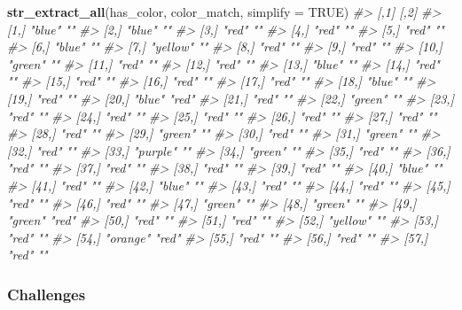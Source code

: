 \documentclass[]{book}
\newenvironment{Shaded}{\begin{snugshade}}{\end{snugshade}}
\newcommand{\CommentTok}[1]{\textcolor[rgb]{0.56,0.35,0.01}{\textit{#1}}}
\newcommand{\DataTypeTok}[1]{\textcolor[rgb]{0.13,0.29,0.53}{#1}}
\newcommand{\KeywordTok}[1]{\textcolor[rgb]{0.13,0.29,0.53}{\textbf{#1}}}
\newcommand{\NormalTok}[1]{#1}
\newcommand{\OtherTok}[1]{\textcolor[rgb]{0.56,0.35,0.01}{#1}}
\begin{document}
\begin{Shaded}
\begin{Highlighting}[]
\KeywordTok{str_extract_all}\NormalTok{(has_color, color_match, }\DataTypeTok{simplify =} \OtherTok{TRUE}\NormalTok{)}
\CommentTok{#>       [,1]     [,2] }
\CommentTok{#>  [1,] "blue"   ""   }
\CommentTok{#>  [2,] "blue"   ""   }
\CommentTok{#>  [3,] "red"    ""   }
\CommentTok{#>  [4,] "red"    ""   }
\CommentTok{#>  [5,] "red"    ""   }
\CommentTok{#>  [6,] "blue"   ""   }
\CommentTok{#>  [7,] "yellow" ""   }
\CommentTok{#>  [8,] "red"    ""   }
\CommentTok{#>  [9,] "red"    ""   }
\CommentTok{#> [10,] "green"  ""   }
\CommentTok{#> [11,] "red"    ""   }
\CommentTok{#> [12,] "red"    ""   }
\CommentTok{#> [13,] "blue"   ""   }
\CommentTok{#> [14,] "red"    ""   }
\CommentTok{#> [15,] "red"    ""   }
\CommentTok{#> [16,] "red"    ""   }
\CommentTok{#> [17,] "red"    ""   }
\CommentTok{#> [18,] "blue"   ""   }
\CommentTok{#> [19,] "red"    ""   }
\CommentTok{#> [20,] "blue"   "red"}
\CommentTok{#> [21,] "red"    ""   }
\CommentTok{#> [22,] "green"  ""   }
\CommentTok{#> [23,] "red"    ""   }
\CommentTok{#> [24,] "red"    ""   }
\CommentTok{#> [25,] "red"    ""   }
\CommentTok{#> [26,] "red"    ""   }
\CommentTok{#> [27,] "red"    ""   }
\CommentTok{#> [28,] "red"    ""   }
\CommentTok{#> [29,] "green"  ""   }
\CommentTok{#> [30,] "red"    ""   }
\CommentTok{#> [31,] "green"  ""   }
\CommentTok{#> [32,] "red"    ""   }
\CommentTok{#> [33,] "purple" ""   }
\CommentTok{#> [34,] "green"  ""   }
\CommentTok{#> [35,] "red"    ""   }
\CommentTok{#> [36,] "red"    ""   }
\CommentTok{#> [37,] "red"    ""   }
\CommentTok{#> [38,] "red"    ""   }
\CommentTok{#> [39,] "red"    ""   }
\CommentTok{#> [40,] "blue"   ""   }
\CommentTok{#> [41,] "red"    ""   }
\CommentTok{#> [42,] "blue"   ""   }
\CommentTok{#> [43,] "red"    ""   }
\CommentTok{#> [44,] "red"    ""   }
\CommentTok{#> [45,] "red"    ""   }
\CommentTok{#> [46,] "red"    ""   }
\CommentTok{#> [47,] "green"  ""   }
\CommentTok{#> [48,] "green"  ""   }
\CommentTok{#> [49,] "green"  "red"}
\CommentTok{#> [50,] "red"    ""   }
\CommentTok{#> [51,] "red"    ""   }
\CommentTok{#> [52,] "yellow" ""   }
\CommentTok{#> [53,] "red"    ""   }
\CommentTok{#> [54,] "orange" "red"}
\CommentTok{#> [55,] "red"    ""   }
\CommentTok{#> [56,] "red"    ""   }
\CommentTok{#> [57,] "red"    ""}
\end{Highlighting}
\end{Shaded}

\hypertarget{challenges-18}{%
\subsubsection{Challenges}\label{challenges-18}}
\end{document}
